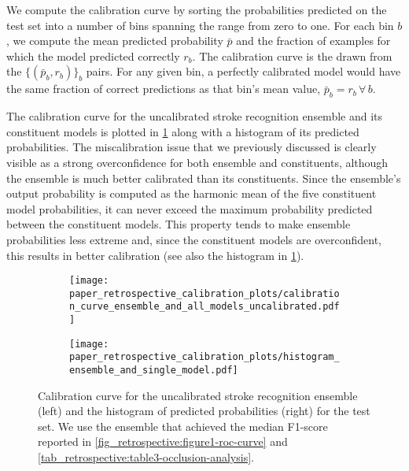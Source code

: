 We compute the calibration curve by sorting the probabilities predicted on the test set into a number of bins spanning the range from zero to one. For each bin $b$, we compute the mean predicted probability $\bar{p}$ and the fraction of examples for which the model predicted correctly $r_{b}$. The calibration curve is the drawn from the $\{(\bar{p}_{b}, r_{b})\}_b$ pairs. For any given bin, a perfectly calibrated model would have the same fraction of correct predictions as that bin's mean value, $\bar{p}_{b} = r_{b}\,\forall\,b$. 

The calibration curve for the uncalibrated stroke recognition ensemble and its constituent models is plotted in \cref{fig_discussion:retrospective-paper-calibration-curve-of-uncalibrated-model} along with a histogram of its predicted probabilities. The miscalibration issue that we previously discussed is clearly visible as a strong overconfidence for both ensemble and constituents, although the ensemble is much better calibrated than its constituents. Since the ensemble's output probability is computed as the harmonic mean of the five constituent model probabilities, it can never exceed the maximum probability predicted between the constituent models. This property tends to make ensemble probabilities less extreme and, since the constituent models are overconfident, this results in better calibration (see also the histogram in \cref{fig_discussion:retrospective-paper-calibration-curve-of-uncalibrated-model}). 

\begin{figure}
    \begin{subfigure}[c]{0.48\columnwidth}
        \centering
        \texttt{[image: paper\_retrospective\_calibration\_plots/calibration\_curve\_ensemble\_and\_all\_models\_uncalibrated.pdf]}
    \end{subfigure}
    \begin{subfigure}[c]{0.48\columnwidth}
        \centering
        \texttt{[image: paper\_retrospective\_calibration\_plots/histogram\_ensemble\_and\_single\_model.pdf]}
    \end{subfigure}
    \caption[Calibration curve for the uncalibrated stroke recognition ensemble and empirical distribution of predicted probabilities.]{%
        Calibration curve for the uncalibrated stroke recognition ensemble (left) and the histogram of predicted probabilities (right) for the test set. 
        We use the ensemble that achieved the median F1-score reported in \cref{fig_retrospective:figure1-roc-curve} and \cref{tab_retrospective:table3-occlusion-analysis}.}
    \label{fig_discussion:retrospective-paper-calibration-curve-of-uncalibrated-model}
\end{figure}

